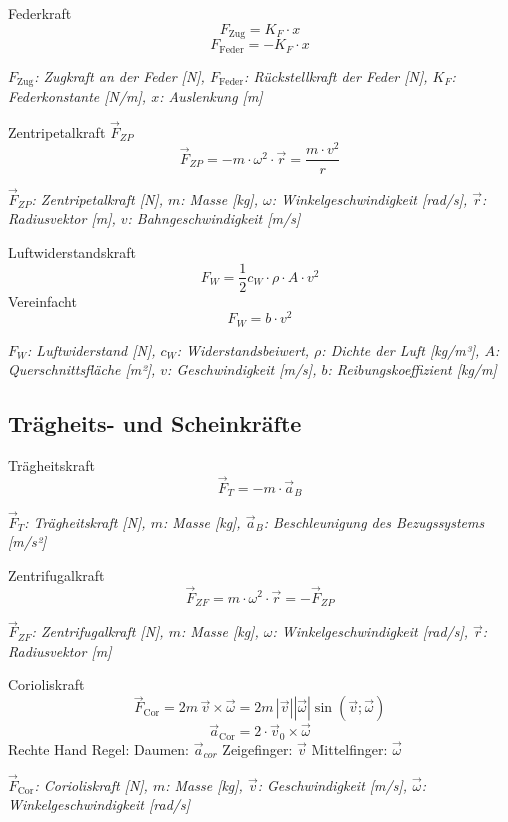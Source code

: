 \documentclass[a4paper,10pt]{article}
\newenvironment{displayformula}
{
	\begin{framed}
		\color{formulaColor}
	}
	{\end{framed}}
\newcommand{\formulalegend}[1]{%
	\par\vspace{0.5ex}%
	{{\color{legendColor}\RaggedRight\small\textit{#1}}}%
	\par\vspace{1.5ex}%
}
\begin{document}
\begin{displayformula}
	Federkraft
	\[
	F_{\text{Zug}} = K_F \cdot x
	\]
	\[
	F_{\text{Feder}} = -K_F \cdot x
	\]
\end{displayformula}
\formulalegend{
	\( F_{\text{Zug}} \): Zugkraft an der Feder [N], \( F_{\text{Feder}} \): Rückstellkraft der Feder [N], \( K_F \): Federkonstante [N/m], \( x \): Auslenkung [m]
}

\begin{displayformula}
	Zentripetalkraft \( \vec{F}_{ZP} \)
	\[
	\vec{F}_{ZP} = -m \cdot \omega^2 \cdot \vec{r} = \frac{m \cdot v^2}{r}
	\]
\end{displayformula}
\formulalegend{
	\( \vec{F}_{ZP} \): Zentripetalkraft [N], \( m \): Masse [kg], \( \omega \): Winkelgeschwindigkeit [rad/s], \( \vec{r} \): Radiusvektor [m], \( v \): Bahngeschwindigkeit [m/s]
}

\begin{displayformula}
	Luftwiderstandskraft
	\[
	F_W = \frac{1}{2} c_W \cdot \rho \cdot A \cdot v^2
	\]
	Vereinfacht
	\[
	F_W = b \cdot v^2
	\]
\end{displayformula}
\formulalegend{
	\( F_W \): Luftwiderstand [N], \( c_W \): Widerstandsbeiwert, \( \rho \): Dichte der Luft [kg/m³], \( A \): Querschnittsfläche [m²], \( v \): Geschwindigkeit [m/s], \( b \): Reibungskoeffizient [kg/m]
}


\subsection{Trägheits- und Scheinkräfte}

\begin{displayformula}
	Trägheitskraft
	\[
	\vec{F}_T = -m \cdot \vec{a}_B
	\]
\end{displayformula}
\formulalegend{
	\( \vec{F}_T \): Trägheitskraft [N], \( m \): Masse [kg], \( \vec{a}_B \): Beschleunigung des Bezugssystems [m/s²]
}

\begin{displayformula}
	Zentrifugalkraft
	\[
	\vec{F}_{ZF} = m \cdot \omega^2 \cdot \vec{r} = - \vec{F}_{ZP}
	\]
\end{displayformula}
\formulalegend{
	\( \vec{F}_{ZF} \): Zentrifugalkraft [N], \( m \): Masse [kg], \( \omega \): Winkelgeschwindigkeit [rad/s], \( \vec{r} \): Radiusvektor [m]
}

\begin{displayformula}
	Corioliskraft
	\[
	\vec{F}_{\mathrm{Cor}} = 2m\, \vec{v} \times \vec{\omega} = 2m\, | \vec{v} | | \vec{\omega} | \sin(\vec{v}; \vec{\omega})
	\]
	\[
	\vec{a}_{\mathrm{Cor}} = 2 \cdot \vec{v}_0 \times \vec{\omega}
	\]
	Rechte Hand Regel: Daumen: $\vec{a}_{cor}$ Zeigefinger: $\vec{v}$ Mittelfinger: $\vec{\omega}$
\end{displayformula}
\formulalegend{
	\( \vec{F}_{\mathrm{Cor}} \): Corioliskraft [N], \( m \): Masse [kg], \( \vec{v} \): Geschwindigkeit [m/s], \( \vec{\omega} \):  Winkelgeschwindigkeit [rad/s]
}
\end{document}
